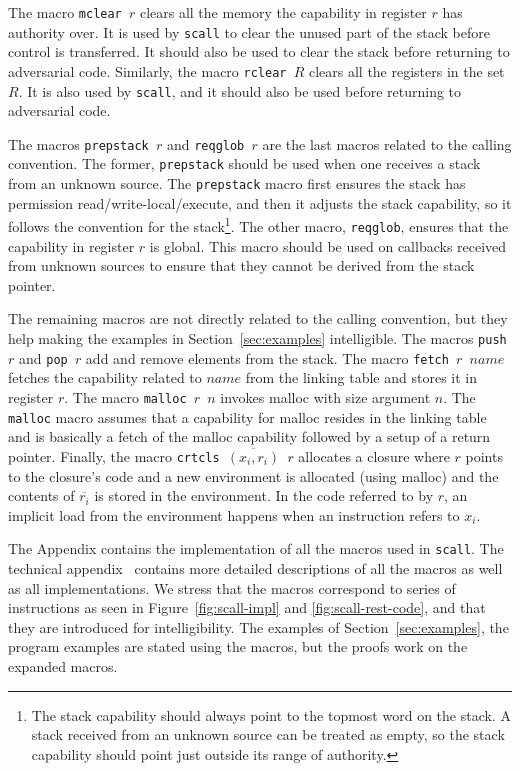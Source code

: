 \documentclass[format=acmsmall, review=true, screen=true]{acmart}
\renewcommand{\figurename}{Figure}
\renewcommand{\sectionname}{Section}
\newcommand{\var}[1]{\mathit{#1}}
\newenvironment{toplas}{}{}
\newcommand{\itoplassug}[1]{}
\begin{document}
\begin{toplas}
The macro \texttt{mclear $r$} clears all the memory the
capability in register $r$ has authority over. It is used by \texttt{scall} to
clear the unused part of the stack before control is transferred. It should also
be used to clear the stack before returning to adversarial code. Similarly, the
macro \texttt{rclear $R$} clears all the registers in the set
$R$. It is also used by \texttt{scall}, and it should also be used before
returning to adversarial code.

The macros \texttt{prepstack $r$} and \texttt{reqglob
    $r$} are the last macros related to the calling convention. The former,
\texttt{prepstack} should be used when one receives a stack from an unknown
source. The \texttt{prepstack} macro first ensures the stack has permission
read/write-local/execute, and then it adjusts the stack capability, so it
follows the convention for the stack\footnote{The stack capability should always
point to the topmost word on the stack. A stack received from an unknown source
can be treated as empty, so the stack capability should point just outside its
range of authority.}. The other macro, \texttt{reqglob}, ensures that the
capability in register $r$ is global. This macro should be used on callbacks
received from unknown sources to ensure that they cannot be derived from the
stack pointer.

The remaining macros are not directly related to the calling convention, but
they help making the examples in \sectionname~\ref{sec:examples} intelligible.
The macros \texttt{push $r$} and \texttt{pop $r$}
add and remove elements from the stack. The macro \texttt{fetch
    $r$ $\var{name}$} fetches the capability related to $\var{name}$ from the
linking table and stores it in register $r$. The macro
\texttt{malloc $r$ $n$} invokes malloc with size argument $n$.
The \texttt{malloc} macro assumes that a capability for malloc resides in the
linking table and is basically a fetch of the malloc capability followed by a
setup of a return pointer. Finally, the macro \texttt{crtcls
    $\overline{(x_i,r_i)}$ $r$} allocates a closure where $r$ points to the
closure's code and a new environment is allocated (using malloc) and the
contents of $\overline{r_i}$ is stored in the environment. In the code referred
to by $r$, an implicit load from the environment happens when an instruction
refers to $x_i$.

The Appendix contains the implementation of all the macros used in
\texttt{scall}. The technical appendix~\citep{technical_appendix} contains more
detailed descriptions of all the macros as well as all implementations.
We stress that the macros correspond to series of instructions as seen in
\figurename~\ref{fig:scall-impl} and \ref{fig:scall-rest-code}, and that they
are introduced for intelligibility. The examples of
\sectionname~\ref{sec:examples}, the program examples are stated using the
macros, but the proofs work on the expanded macros.
\end{toplas}
\end{document}
